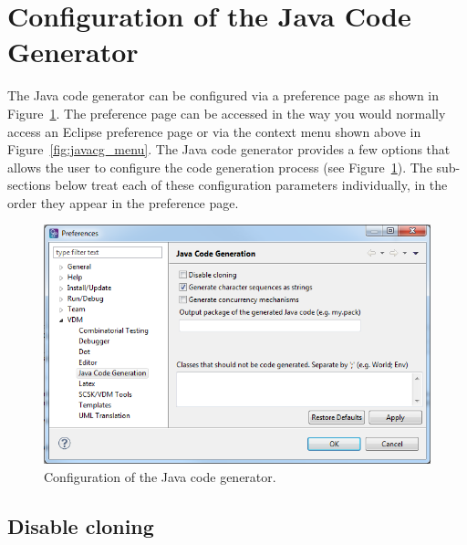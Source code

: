 \section{Configuration of the Java Code Generator}

The Java code generator can be configured via a preference page as
shown in Figure~\ref{fig:javacg_config}. The preference page can be
accessed in the way you would normally access an Eclipse preference
page or via the context menu shown above in
Figure~\ref{fig:javacg_menu}. The Java code generator provides a few
options that allows the user to configure the code generation process
(see Figure~\ref{fig:javacg_config}). The sub-sections below treat
each of these configuration parameters individually, in the order they
appear in the preference page.

\begin{figure}[htbp]
\begin{center}
\includegraphics[width=13cm]{screenDumps/javacg_config}
\caption{Configuration of the Java code generator.\label{fig:javacg_config}}
\end{center}
\end{figure}

\subsection{Disable cloning}

